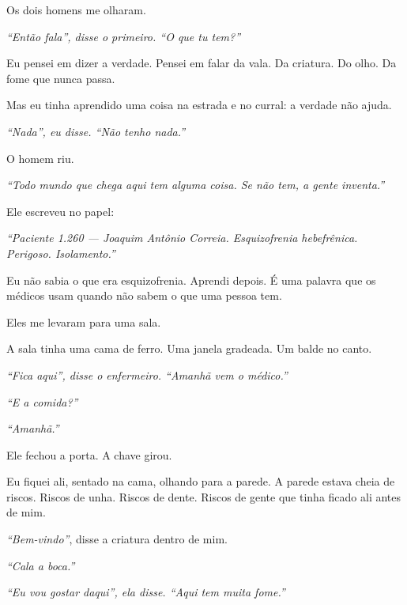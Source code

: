 \noindent Os dois homens me olharam.

\noindent \textit{\textquotedblleft{}Então fala\textquotedblright{}\textit{, disse o primeiro. }\textquotedblleft{}O que tu tem?\textquotedblright{}}

\noindent Eu pensei em dizer a verdade. Pensei em falar da vala. Da criatura. Do olho. Da fome que nunca passa.

\noindent Mas eu tinha aprendido uma coisa na estrada e no curral: a verdade não ajuda.

\noindent \textit{\textquotedblleft{}Nada\textquotedblright{}\textit{, eu disse. }\textquotedblleft{}Não tenho nada.\textquotedblright{}}

\noindent O homem riu.

\noindent \textit{\textquotedblleft{}Todo mundo que chega aqui tem alguma coisa. Se não tem, a gente inventa.\textquotedblright{}}

\noindent Ele escreveu no papel:

\noindent \textit{\textquotedblleft{}Paciente 1.260 --- Joaquim Antônio Correia. Esquizofrenia hebefrênica. Perigoso. Isolamento.\textquotedblright{}}

\noindent Eu não sabia o que era esquizofrenia. Aprendi depois. É uma palavra que os médicos usam quando não sabem o que uma pessoa tem.

\noindent Eles me levaram para uma sala.

\noindent A sala tinha uma cama de ferro. Uma janela gradeada. Um balde no canto.

\noindent \textit{\textquotedblleft{}Fica aqui\textquotedblright{}\textit{, disse o enfermeiro. }\textquotedblleft{}Amanhã vem o médico.\textquotedblright{}}

\noindent \textit{\textquotedblleft{}E a comida?\textquotedblright{}}

\noindent \textit{\textquotedblleft{}Amanhã.\textquotedblright{}}

\noindent Ele fechou a porta. A chave girou.

\noindent Eu fiquei ali, sentado na cama, olhando para a parede. A parede estava cheia de riscos. Riscos de unha. Riscos de dente. Riscos de gente que tinha ficado ali antes de mim.

\noindent \textit{\textquotedblleft{}Bem-vindo\textquotedblright{}}, disse a criatura dentro de mim.

\noindent \textit{\textquotedblleft{}Cala a boca.\textquotedblright{}}

\noindent \textit{\textquotedblleft{}Eu vou gostar daqui\textquotedblright{}\textit{, ela disse. }\textquotedblleft{}Aqui tem muita fome.\textquotedblright{}}

